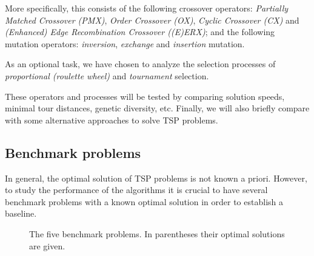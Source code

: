 ﻿\documentclass[a4paper,english,11pt,]{scrartcl}
\begin{document}
More specifically, this consists of the following crossover operators: \emph{Partially Matched Crossover (PMX)}, \emph{Order Crossover (OX)}, \emph{Cyclic Crossover (CX)} and \emph{(Enhanced) Edge Recombination Crossover ((E)ERX)}; and the following mutation operators:  \emph{inversion}, \emph{exchange} and \emph{insertion} mutation. 

As an optional task, we have chosen to analyze the selection processes of \emph{proportional (roulette wheel)} and \emph{tournament} selection. 

These operators and processes will be tested by comparing solution speeds, minimal tour distances, genetic diversity, etc.
Finally, we will also briefly compare with some alternative approaches to solve TSP problems.

\subsection{Benchmark problems}
In general, the optimal solution of TSP problems is not known a priori. However, to study the performance of the algorithms it is crucial to have several benchmark problems with a known optimal solution in order to establish a baseline.


\begin{figure}[hbtp]
\centering
{} \vspace{0.5cm}
                \vspace{0.5cm}

 \vspace{0.5cm}
\caption[The five benchmark problems.]{The five benchmark problems. In parentheses their optimal solutions are given.}
\label{fig:datasets}
\end{figure}
\end{document}
